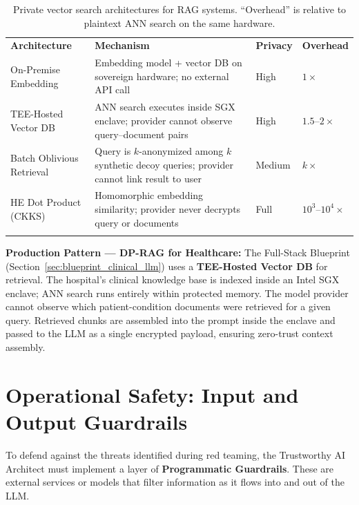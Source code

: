 \begin{table}[ht]
\centering
\caption{Private vector search architectures for RAG systems. ``Overhead'' is relative to plaintext ANN search on the same hardware.}
\label{tab:private_vector_search}
\renewcommand{\arraystretch}{1.3}
\begin{tabular}{p{3.0cm} p{4.0cm} p{1.8cm} p{2.8cm}}
\hline\noalign{\smallskip}
\textbf{Architecture} & \textbf{Mechanism} & \textbf{Privacy} & \textbf{Overhead} \\
\noalign{\smallskip}\svhline\noalign{\smallskip}
On-Premise Embedding & Embedding model + vector DB on sovereign hardware; no external API call & \cellcolor{costlow}High & $1\times$ \\[3pt]
TEE-Hosted Vector DB & ANN search executes inside SGX enclave; provider cannot observe query--document pairs & \cellcolor{costlow}High & $1.5$--$2\times$ \\[3pt]
Batch Oblivious Retrieval & Query is $k$-anonymized among $k$ synthetic decoy queries; provider cannot link result to user & \cellcolor{costmed}Medium & $k\times$ \\[3pt]
HE Dot Product (CKKS) & Homomorphic embedding similarity; provider never decrypts query or documents & \cellcolor{costlow}Full & $10^3$--$10^4\times$ \\
\noalign{\smallskip}\hline\noalign{\smallskip}
\end{tabular}
\end{table}

\begin{svgraybox}
\textbf{Production Pattern --- DP-RAG for Healthcare:} The Full-Stack Blueprint (Section~\ref{sec:blueprint_clinical_llm}) uses a \textbf{TEE-Hosted Vector DB} for retrieval. The hospital's clinical knowledge base is indexed inside an Intel SGX enclave; ANN search runs entirely within protected memory. The model provider cannot observe which patient-condition documents were retrieved for a given query. Retrieved chunks are assembled into the prompt inside the enclave and passed to the LLM as a single encrypted payload, ensuring zero-trust context assembly.
\end{svgraybox}

\section{Operational Safety: Input and Output Guardrails}
\label{sec:llm_guardrails}

To defend against the threats identified during red teaming, the Trustworthy AI Architect must implement a layer of \textbf{Programmatic Guardrails}. These are external services or models that filter information as it flows into and out of the LLM.

